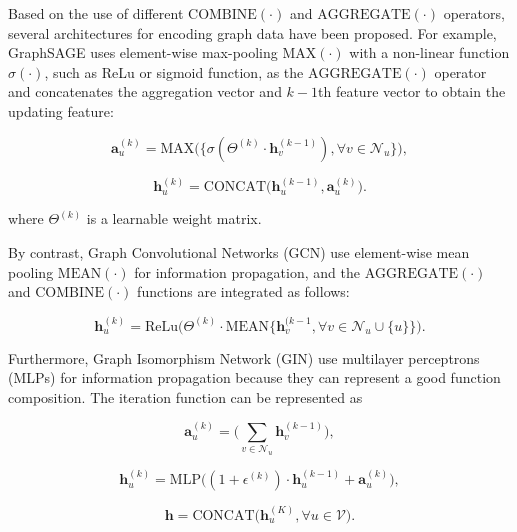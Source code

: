 Based on the use of different $\text{COMBINE}(\cdot)$ and $\text{AGGREGATE}(\cdot)$ operators, several architectures for encoding graph data have been proposed. For example, GraphSAGE \cite{GraphSAGE} uses element-wise max-pooling $\text{MAX}(\cdot)$ with a non-linear function $\sigma(\cdot)$, such as ReLu or sigmoid function, as the $\text{AGGREGATE}(\cdot)$ operator and concatenates the aggregation vector and $k-1$th feature vector to obtain the updating feature:




\begin{equation}
\textbf{a}_{u}^{(k)}={\text{MAX}\Big(\Big\{\sigma(\Theta^{(k)}\cdot\textbf{h}_{v}^{(k-1)}),\forall v\in\mathcal{N}_{u}\Big\}\Big)},
\end{equation}


\begin{equation}
\mathbf{h}_{u}^{(k)}={\text{CONCAT}\Big(\mathbf{h}_{u}^{(k-1)}, \textbf{a}_{u}^{(k)}\Big)}.
\end{equation}


where $\Theta^{(k)}$ is a learnable weight matrix.

By contrast, Graph Convolutional Networks (GCN) \cite{GCN} use element-wise mean pooling $\text{MEAN}(\cdot)$ for information propagation, and the $\text{AGGREGATE}(\cdot)$ and $\text{COMBINE}(\cdot)$ functions are integrated as follows:



\begin{equation}
\mathbf{h}_{u}^{(k)}=\text{ReLu}\Big(\Theta^{(k)}\cdot\text{MEAN}\Big\{\mathbf{h}_{v}^{(k-1}, \forall v\in\mathcal{N}_{u}\cup\{u\}\Big\}\Big).
\end{equation}



Furthermore, Graph Isomorphism Network (GIN) \cite{GIN} use multilayer perceptrons (MLPs) for information propagation because they can represent a good function composition. The iteration function can be represented as


\begin{equation}
\textbf{a}_{u}^{(k)}=\Big(\sum_{v\in\mathcal{N}_{u}}\mathbf{h}_{v}^{(k-1)}\Big),
\end{equation}

\begin{equation}
\mathbf{h}_{u}^{(k)}=\text{MLP}\Big((1+\epsilon^{(k)})\cdot\mathbf{h}_{u}^{(k-1)}+\textbf{a}_{u}^{(k)}\Big),
\end{equation}

\begin{equation}
\textbf{h} = \text{CONCAT}\Big( \mathbf{h}_{u}^{(K)}, \forall u \in \mathcal{V} \Big).
\end{equation}

